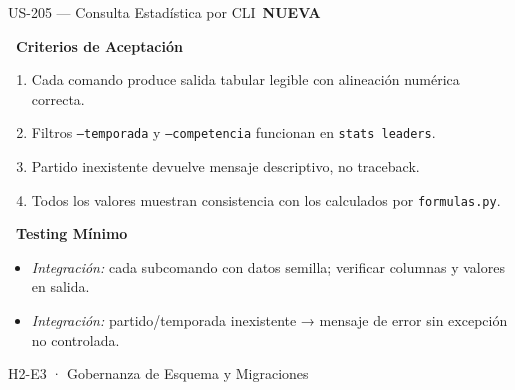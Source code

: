 \documentclass[11pt,a4paper]{article}
\newcommand{\fpath}[1]{\texttt{\small #1}}
\newcommand{\usfield}[2][\;]{%
  \par\vspace{5pt}%
  {\small\textbf{\textcolor{primary}{#2}}}\par\vspace{2pt}%
}
\newcommand{\tagnew}{\,\colorbox{tagnew}{\tiny\bfseries NUEVA}\,}
\begin{document}
\begin{uscard}{US-205 — Consulta Estadística por CLI \tagnew}
\usfield{\faCheckCircle\ Criterios de Aceptación}
\begin{enumerate}[label=\textcolor{accent}{\textbf{AC\arabic*.}}, nosep, leftmargin=2.2em]
  \item Cada comando produce salida tabular legible con alineación numérica correcta.
  \item Filtros \fpath{--temporada} y \fpath{--competencia} funcionan en \fpath{stats leaders}.
  \item Partido inexistente devuelve mensaje descriptivo, no traceback.
  \item Todos los valores muestran consistencia con los calculados por \fpath{formulas.py}.
\end{enumerate}

\usfield{\faFlask\ Testing Mínimo}
\begin{itemize}[nosep, leftmargin=1.6em]
  \item \textit{Integración:} cada subcomando con datos semilla; verificar columnas y valores en salida.
  \item \textit{Integración:} partido/temporada inexistente → mensaje de error sin excepción no controlada.
\end{itemize}

\end{uscard}

\begin{epicbox}{H2-E3 · Gobernanza de Esquema y Migraciones}
\end{epicbox}
\end{document}
